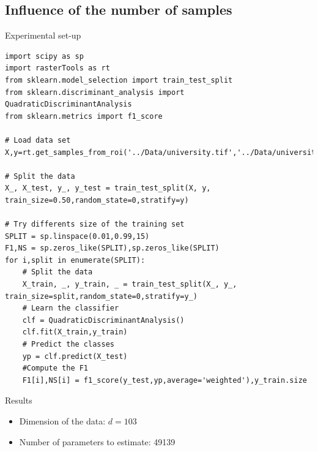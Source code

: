 \documentclass[10pt,aspectratio=1610,,color={dvipsnames,usenames,table},table]{beamer}
\begin{document}
\subsection{Influence of the number of samples}
\label{sec:org1292b06}
\begin{frame}[fragile,label={sec:orgfbf18df}]{Experimental set-up}
 \begin{verbatim}
import scipy as sp
import rasterTools as rt
from sklearn.model_selection import train_test_split
from sklearn.discriminant_analysis import QuadraticDiscriminantAnalysis
from sklearn.metrics import f1_score

# Load data set
X,y=rt.get_samples_from_roi('../Data/university.tif','../Data/university_gt.tif')

# Split the data
X_, X_test, y_, y_test = train_test_split(X, y, train_size=0.50,random_state=0,stratify=y)

# Try differents size of the training set
SPLIT = sp.linspace(0.01,0.99,15)
F1,NS = sp.zeros_like(SPLIT),sp.zeros_like(SPLIT)
for i,split in enumerate(SPLIT):
    # Split the data
    X_train, _, y_train, _ = train_test_split(X_, y_, train_size=split,random_state=0,stratify=y_)
    # Learn the classifier
    clf = QuadraticDiscriminantAnalysis()
    clf.fit(X_train,y_train)
    # Predict the classes
    yp = clf.predict(X_test)
    #Compute the F1
    F1[i],NS[i] = f1_score(y_test,yp,average='weighted'),y_train.size
\end{verbatim}
\end{frame}

\begin{frame}[label={sec:orgdbc756a}]{Results}
\begin{center}
\end{center}

\begin{itemize}
\item Dimension of the data: \(d=103\)
\item Number of parameters to estimate: 49139
\end{itemize}
\end{frame}
\end{document}

